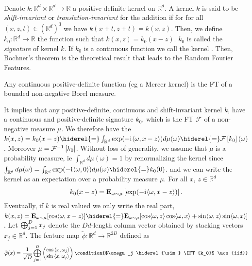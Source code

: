 \documentclass[twoside,11pt]{article}
\begin{document}
\paragraph{}
Denote $k: \mathbb{R}^d \times \mathbb{R}^d \to \mathbb{R}$ a positive
definite kernel \citep{Aronszajn1950} on $\mathbb{R}^d$. A kernel $k$ is said
to be \emph{shift-invariant} or \emph{translation-invariant} for the addition
if for for all $(x,z,t) \in \left(\mathbb{R}^d\right)^3$ we have $k(x+t,z+t) =
k(x,z)$.  Then, we define $k_0: \mathbb{R}^d \to \mathbb{R}$ the function such
that $k(x,z)= k_0(x-z)$. $k_0$ is called the \emph{signature} of kernel $k$. If
$k_0$ is a continuous function we call the kernel . Then, Bochner's
theorem \citep{folland1994course} is the theoretical result that leads to the
Random Fourier Features.
\begin{theorem}\label{th:bochner-scalar}
    Any continuous positive-definite function (\acs{eg} a Mercer kernel) is the
    \acl{FT} of a bounded non-negative Borel measure.
\end{theorem}
It implies that any positive-definite, continuous and shift-invariant kernel
$k$, have a continuous and positive-definite signature $k_0$, which is the
\acl{FT} $\mathcal{F}$ of a non-negative measure $\mu$. We therefore have the
$k(x,z)=k_0(x-z) \hiderel{=} \int_{\mathbb{R}^d} \exp(-\iu \inner{\omega,x -
z}) d\mu(\omega) \hiderel{=}\FT{k_0}(\omega)$.  Moreover $\mu = \mathcal{F}^{-1}\left[k_0\right]$.
Without loss of generality, we assume that $\mu$ is a probability measure,
\acs{ie} $\int_{\mathbb{R}^d} d\mu(\omega)=1$ by renormalizing the kernel since
$\int_{\mathbb{R}^d}d\mu(\omega)= \int_{\mathbb{R}^d}\exp(-\iu \inner{\omega,
0})d\mu(\omega)\hiderel{=}k_0(0)$.  and we can write the kernel as an
expectation over a probability measure $\mu$.  For all $x$, $z\in\mathbb{R}^d$
\begin{dmath*}
    k_0(x-z) = \expectation_{\omega\sim\mu}\left[\exp(-\iu \inner{\omega,x -
    z})\right].
\end{dmath*}
Eventually, if $k$ is real valued we only write the real part, $k(x,z) =
\expectation_{\omega\sim\mu}[\cos \inner{\omega,x - z}] \hiderel{=}
\expectation_{\omega\sim\mu}[ \cos \inner{\omega,z} \cos \inner{\omega,x} +
\sin \inner{\omega,z} \sin \inner{\omega,x}]$.  Let $\operatorname*{\bigoplus}_{j=1}^D x_j$ denote
the $Dd$-length column vector obtained by stacking vectors $x_j \in
\mathbb{R}^d$.  The feature map $\widetilde{\phi}: \mathbb{R}^d \rightarrow
\mathbb{R}^{2D}$ defined as
\begin{dmath}
    \label{eq:rff}
    \widetilde{\phi}(x)=\frac{1}{\sqrt{D}}\Vect_{j=1}^D
    \begin{pmatrix}
        \cos{\inner{x,\omega_j}} \\
        \sin{\inner{x,\omega_j}}
    \end{pmatrix}\condition{$\omega_j \hiderel{\sim} \IFT{k_0}$ \acs{iid}}
\end{dmath}
\end{document}
